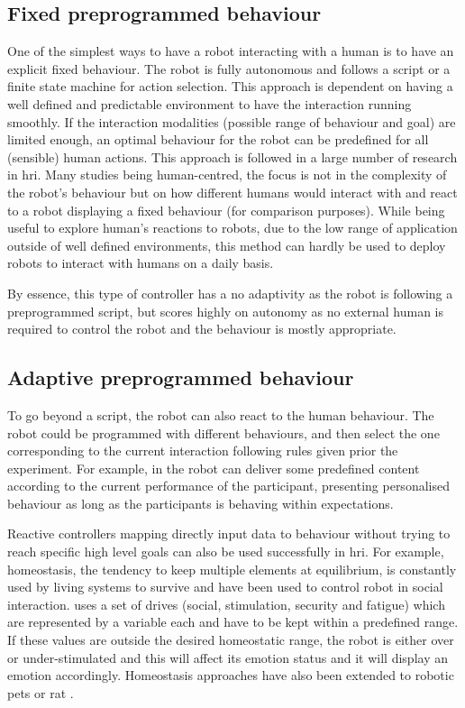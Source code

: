 \subsection{Fixed preprogrammed behaviour}

    One of the simplest ways to have a robot interacting with a human is to have an explicit fixed behaviour. The robot is fully autonomous and follows a script or a finite state machine for action selection. This approach is dependent on having a well defined and predictable environment to have the interaction running smoothly. If the interaction modalities (possible range of behaviour and goal) are limited enough, an optimal behaviour for the robot can be predefined for all (sensible) human actions. This approach is followed in a large number of research in \gls{hri}. Many studies being human-centred, the focus is not in the complexity of the robot's behaviour but on how different humans would interact with and react to a robot displaying a fixed behaviour (for comparison purposes). While being useful to explore human's reactions to robots, due to the low range of application outside of well defined environments, this method can hardly be used to deploy robots to interact with humans on a daily basis.

    By essence, this type of controller has a no adaptivity as the robot is following a preprogrammed script, but scores highly on autonomy as no external human is required to control the robot and the behaviour is mostly appropriate. 

\subsection{Adaptive preprogrammed behaviour}
	
	To go beyond a script, the robot can also react to the human behaviour. The robot could be programmed with different behaviours, and then select the one corresponding to the current interaction following rules given prior the experiment. For example, in \citet{leyzberg2014personalizing} the robot can deliver some predefined content according to the current performance of the participant, presenting personalised behaviour as long as the participants is behaving within expectations. 

	Reactive controllers mapping directly input data to behaviour without trying to reach specific high level goals can also be used successfully in \gls{hri}. For example, homeostasis, the tendency to keep multiple elements at equilibrium, is constantly used by living systems to survive and have been used to control robot in social interaction. \citet{breazeal1998motivational} uses a set of drives (social, stimulation, security and fatigue) which are represented by a variable each and have to be kept within a predefined range. If these values are outside the desired homeostatic range, the robot is either over or under-stimulated and this will affect its emotion status and it will display an emotion accordingly. Homeostasis approaches have also been extended to robotic pets \citep{arkin2003ethological} or \gls{rat} \citet{cao2017collaborative}.

